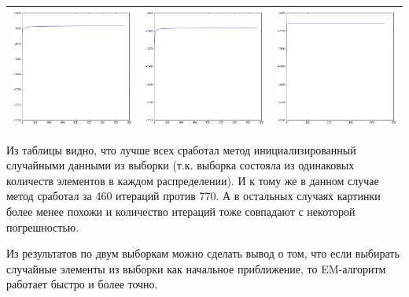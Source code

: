 \documentclass[12pt, a4paper]{article}
\begin{document}
\begin{center}
\begin{tabular}{c c c}
				\includegraphics[width=5cm]{4par_kminit_MLE_bad.png} &
				\includegraphics[width=5cm]{4par_rdinit_MLE_bad.png} &
				\includegraphics[width=5cm]{4par_rdinitx_MLE_bad.png} \\

				\hline
			\end{tabular}
			\end{center}

			Из таблицы видно, что лучше всех сработал метод инициализированный случайными данными из выборки (т.к. выборка состояла из одинаковых количеств элементов в каждом распределении). И к тому же в данном случае метод сработал за 460 итераций против 770. А в остальных случаях картинки более менее похожи и количество итераций тоже совпадают с некоторой погрешностью. 

			Из результатов по двум выборкам можно сделать вывод о том, что если выбирать случайные элементы из выборки как начальное приближение, то EM-алгоритм работает быстро и более точно.

	\newpage
\end{document}
